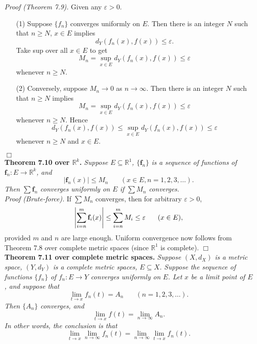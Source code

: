 \documentclass{article}
\begin{document}
\emph{Proof (Theorem 7.9).}
Given any $\varepsilon > 0$.
\begin{enumerate}
  \item[(1)]
  Suppose $\{f_n\}$ converges uniformly on $E$.
  Then there is an integer $N$ such that $n \geq N$, $x \in E$ implies
  \[
    d_Y(f_n(x),f(x)) \leq \varepsilon.
  \]
  Take sup over all $x \in E$ to get
  \[
    M_n = \sup_{x \in E} d_Y(f_n(x),f(x)) \leq \varepsilon
  \]
  whenever $n \geq N$.

  \item[(2)]
  Conversely, suppose $M_n \to 0$ as $n \to \infty$.
  Then there is an integer $N$ such that $n \geq N$ implies
  \[
    M_n = \sup_{x \in E} d_Y(f_n(x),f(x)) \leq \varepsilon
  \]
  whenever $n \geq N$.
  Hence
  \[
    d_Y(f_n(x),f(x)) \leq \sup_{x \in E} d_Y(f_n(x),f(x)) \leq \varepsilon
  \]
  whenever $n \geq N$ and $x \in E$.
\end{enumerate}
$\Box$ \\



\textbf{Theorem 7.10 over $\mathbb{R}^k$.}
\emph{Suppose $E \subseteq \mathbb{R}^1$,
$\{\mathbf{f}_n\}$ is a sequence of functions of $\mathbf{f}_n: E \to \mathbb{R}^k$,
and
\[
  |\mathbf{f}_n(x)| \leq M_n
  \:\:\:\:\:\:\:\:
  (x \in E, n = 1,2,3,\ldots).
\]
Then $\sum \mathbf{f}_n$ converges uniformly on $E$ if $\sum M_n$ converges.} \\

\emph{Proof (Brute-force).}
If $\sum M_n$ converges, then for arbitrary $\varepsilon > 0$,
\[
  \abs{\sum_{i=n}^{m}\mathbf{f}_i(x)} \leq \sum_{i=n}^{m}M_i \leq \varepsilon
  \:\:\:\:\:\:\:\:
  (x \in E),
\]
provided $m$ and $n$ are large enough.
Uniform convergence now follows from Theorem 7.8 over complete metric spaces
(since $\mathbb{R}^1$ is complete).
$\Box$ \\



\textbf{Theorem 7.11 over complete metric spaces.}
\emph{Suppose $(X,d_X)$ is a metric space,
$(Y,d_Y)$ is a complete metric spaces, $E \subseteq X$.
Suppose the sequence of functions $\{f_n\}$ of $f_n: E \to Y$
converges uniformly on $E$.
Let $x$ be a limit point of $E$, and suppose that
\[
  \lim_{t \to x} f_n(t) = A_n
  \:\:\:\:\:\:\:\:
  (n=1,2,3,\ldots).
\]
Then $\{A_n\}$ converges, and
\[
  \lim_{t \to x}f(t) = \lim_{n \to \infty} A_n.
\]
In other words, the conclusion is that}
\[
  \lim_{t \to x} \lim_{n \to \infty} f_n(t)
  = \lim_{n \to \infty} \lim_{t \to x} f_n(t).
\]
\end{document}

